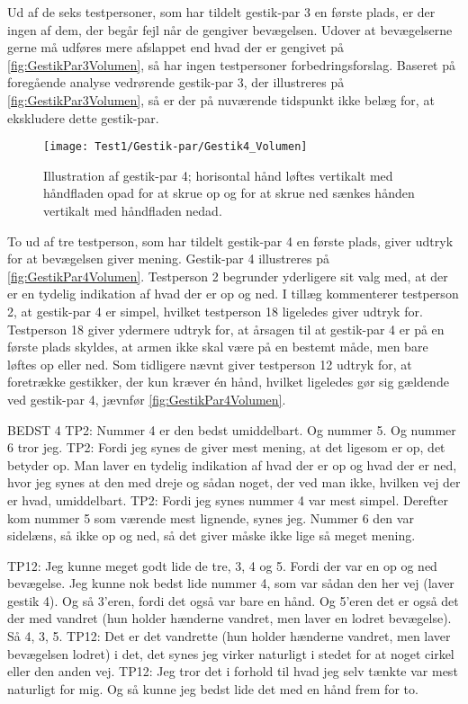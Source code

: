 Ud af de seks testpersoner, som har tildelt gestik-par 3 en første plads, er der ingen af dem, der begår fejl når de gengiver bevægelsen. Udover at bevægelserne gerne må udføres mere afslappet end hvad der er gengivet på \autoref{fig:GestikPar3Volumen}, så har ingen testpersoner forbedringsforslag. Baseret på foregående analyse vedrørende gestik-par 3, der illustreres på \autoref{fig:GestikPar3Volumen}, så er der på nuværende tidspunkt ikke belæg for, at ekskludere dette gestik-par.
%
\begin{figure}[H]
	\centering
	\texttt{[image: Test1/Gestik-par/Gestik4\_Volumen]}
	\caption{Illustration af gestik-par 4; horisontal hånd løftes vertikalt med håndfladen opad for at skrue op og for at skrue ned sænkes hånden vertikalt med håndfladen nedad.}
	\label{fig:GestikPar4Volumen}
\end{figure}
\noindent
%
To ud af tre testperson, som har tildelt gestik-par 4 en første plads, giver udtryk for at bevægelsen giver mening. Gestik-par 4 illustreres på \autoref{fig:GestikPar4Volumen}. Testperson 2 begrunder yderligere sit valg med, at der er en tydelig indikation af hvad der er op og ned.  I tillæg kommenterer testperson 2, at gestik-par 4 er simpel, hvilket testperson 18 ligeledes giver udtryk for. Testperson 18 giver ydermere udtryk for, at årsagen til at gestik-par 4 er på en første plads skyldes, at armen ikke skal være på en bestemt måde, men bare løftes op eller ned. Som tidligere nævnt giver testperson 12 udtryk for, at foretrække gestikker, der kun kræver én hånd, hvilket ligeledes gør sig gældende ved gestik-par 4, jævnfør \autoref{fig:GestikPar4Volumen}.  








BEDST 4 
TP2: Nummer 4 er den bedst umiddelbart. Og nummer 5. Og nummer 6 tror jeg.
TP2: Fordi jeg synes de giver mest mening, at det ligesom er op, det betyder op. Man laver en tydelig indikation af hvad der er op og hvad der er ned, hvor jeg synes at den med dreje og sådan noget, der ved man ikke, hvilken vej der er hvad, umiddelbart.
TP2: Fordi jeg synes nummer 4 var mest simpel. Derefter kom nummer 5 som værende mest lignende, synes jeg. Nummer 6 den var sidelæns, så ikke op og ned, så det giver måske ikke lige så meget mening.  


TP12: Jeg kunne meget godt lide de tre, 3, 4 og 5. Fordi der var en op og ned bevægelse. Jeg kunne nok bedst lide nummer 4, som var sådan den her vej (laver gestik 4). Og så 3’eren, fordi det også var bare en hånd. Og 5’eren det er også det der med vandret (hun holder hænderne vandret, men laver en lodret bevægelse). Så 4, 3, 5. 
TP12: Det er det vandrette (hun holder hænderne vandret, men laver bevægelsen lodret) i det, det synes jeg virker naturligt i stedet for at noget cirkel eller den anden vej. 
TP12: Jeg tror det i forhold til hvad jeg selv tænkte var mest naturligt for mig. Og så kunne jeg bedst lide det med en hånd frem for to. 

